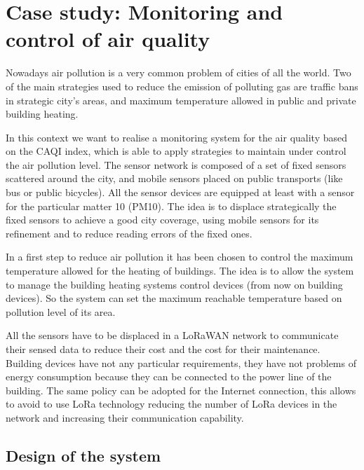 \section{Case study: Monitoring and control of air quality}

\label{sec:case-staudyAC}


Nowadays air pollution is a very common problem of cities of all the world.
Two of the main strategies used to reduce the emission of polluting gas are traffic bans in strategic city's areas, and maximum temperature allowed in public and private building heating.

In this context we want to realise a monitoring system for the air quality based on the CAQI index, which is able to apply strategies to maintain under control the air pollution level.
The sensor network is composed of a set of fixed sensors scattered around the city, and mobile sensors placed on public transports (like bus or public bicycles).
All the sensor devices are equipped at least with a sensor for the particular matter 10 (PM10).
The idea is to displace strategically the fixed sensors to achieve a good city coverage, using mobile sensors for its refinement and to reduce reading errors of the fixed ones.

In a first step to reduce air pollution it has been chosen to control the maximum temperature allowed for the heating of buildings.
The idea is to allow the system to manage the building heating systems control devices (from now on building devices). So the system can set the maximum reachable temperature based on pollution level of its area.

All the sensors have to be displaced in a LoRaWAN network to communicate their sensed data to reduce their cost and the cost for their maintenance. 
Building devices have not any particular requirements, they have not problems of energy consumption because they can be connected to the power line of the building.
The same policy can be adopted for the Internet connection, this allows to avoid to use LoRa technology reducing the number of LoRa devices in the network and increasing their communication capability.

\subsection{Design of the system}

